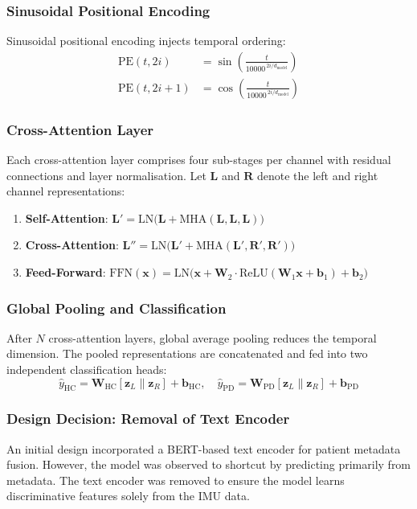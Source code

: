 \documentclass[conference]{IEEEtran}
\begin{document}
\subsubsection{Sinusoidal Positional Encoding}
Sinusoidal positional encoding injects temporal ordering:
\begin{align}
\text{PE}(t, 2i)   &= \sin\!\left(\frac{t}{10000^{\,2i / d_{\text{model}}}}\right) \\
\text{PE}(t, 2i+1) &= \cos\!\left(\frac{t}{10000^{\,2i / d_{\text{model}}}}\right)
\end{align}

\subsubsection{Cross-Attention Layer}
Each cross-attention layer comprises four sub-stages per channel with residual connections and layer normalisation. Let $\mathbf{L}$ and $\mathbf{R}$ denote the left and right channel representations:
\begin{enumerate}[noitemsep]
  \item \textbf{Self-Attention}: $\mathbf{L}' = \text{LN}\!\bigl(\mathbf{L} + \text{MHA}(\mathbf{L}, \mathbf{L}, \mathbf{L})\bigr)$
  \item \textbf{Cross-Attention}: $\mathbf{L}'' = \text{LN}\!\bigl(\mathbf{L}' + \text{MHA}(\mathbf{L}', \mathbf{R}', \mathbf{R}')\bigr)$
  \item \textbf{Feed-Forward}: $\text{FFN}(\mathbf{x}) = \text{LN}\!\bigl(\mathbf{x} + \mathbf{W}_2 \cdot \text{ReLU}(\mathbf{W}_1 \mathbf{x} + \mathbf{b}_1) + \mathbf{b}_2\bigr)$
\end{enumerate}

\subsubsection{Global Pooling and Classification}
After $N$ cross-attention layers, global average pooling reduces the temporal dimension. The pooled representations are concatenated and fed into two independent classification heads:
\begin{equation}
\hat{y}_{\text{HC}} = \mathbf{W}_{\text{HC}} [\mathbf{z}_L \| \mathbf{z}_R] + \mathbf{b}_{\text{HC}}, \quad
\hat{y}_{\text{PD}} = \mathbf{W}_{\text{PD}} [\mathbf{z}_L \| \mathbf{z}_R] + \mathbf{b}_{\text{PD}}
\end{equation}

\subsubsection{Design Decision: Removal of Text Encoder}
An initial design incorporated a BERT-based text encoder for patient metadata fusion. However, the model was observed to shortcut by predicting primarily from metadata. The text encoder was removed to ensure the model learns discriminative features solely from the IMU data.
\end{document}
